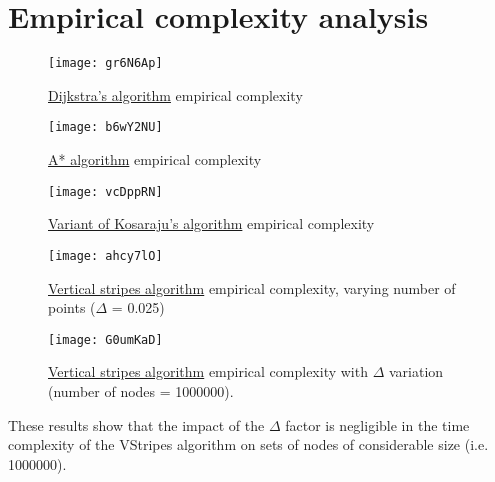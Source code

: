 \chapter{Empirical complexity analysis} \label{empirical}


\begin{figure}[H]
    \centering
    \texttt{[image: gr6N6Ap]}
    \caption{\hyperref[algorithm-shortestpath-dijkstra]{Dijkstra's algorithm} empirical complexity}
\end{figure}

\begin{figure}[H]
    \centering
    \texttt{[image: b6wY2NU]}
    \caption{\hyperref[algorithm-shortestpath-astar]{A* algorithm} empirical complexity}
\end{figure}

\begin{figure}[H]
    \centering
    \texttt{[image: vcDppRN]}
    \caption{\hyperref[algorithm-scc-kosaraju-v]{Variant of Kosaraju's algorithm} empirical complexity}
\end{figure}

\begin{figure}[H]
    \centering
    \texttt{[image: ahcy7lO]}
    \caption{\hyperref[algorithm-vstripes]{Vertical stripes algorithm} empirical complexity, varying number of points ($\Delta$ = 0.025)}
\end{figure}

\begin{figure}[H]
    \centering
    \texttt{[image: G0umKaD]}
    \caption{\hyperref[algorithm-vstripes]{Vertical stripes algorithm} empirical complexity with $\Delta$ variation (number of nodes = 1000000).}
\end{figure}

These results show that the impact of the $\Delta$ factor is negligible in the time complexity of the VStripes algorithm on sets of nodes of considerable size (i.e. 1000000).

